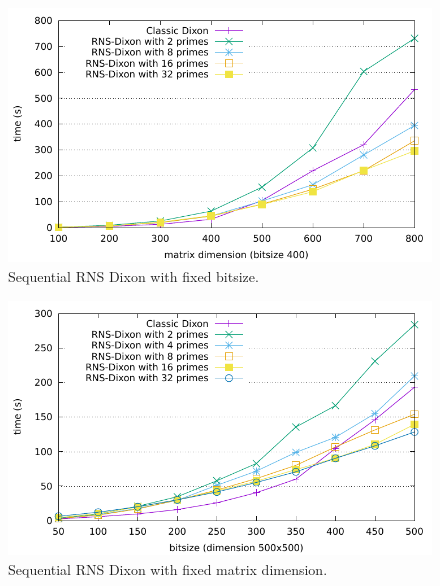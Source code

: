 \begin{figure}[htb]
\begin{center}
  \includegraphics[width=.8\textwidth]{Pictures/RNSDixon/sequential-primesCount}
\end{center}
\caption{Sequential RNS Dixon with fixed bitsize.}\label{fig:rnsdixon_seqprimescount}
\end{figure}
\begin{figure}[htb]
\begin{center}
  \includegraphics[width=.8\textwidth]{Pictures/RNSDixon/sequential-bitsize}
\end{center}
\caption{Sequential RNS Dixon with fixed matrix dimension.}\label{fig:rnsdixon_seqbitsize}
\end{figure}

